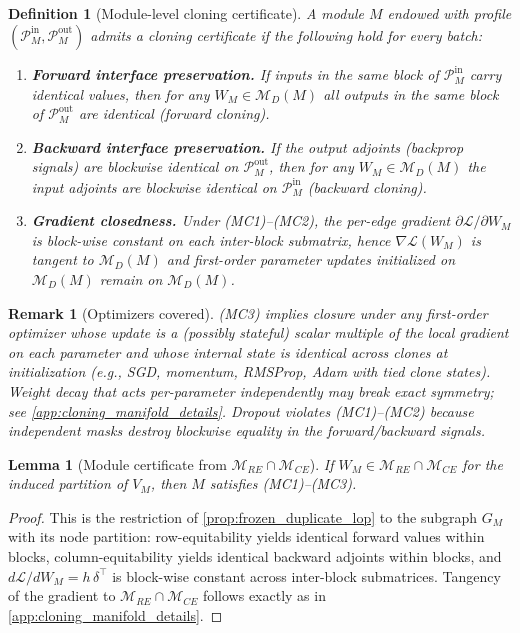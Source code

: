 \documentclass{article}
\newcommand{\Loss}{\mathcal{L}}
\newcommand{\ManifoldD}{\mathcal{M}_{D}}
\newcommand{\ManifoldRE}{\mathcal{M}_{RE}}
\newcommand{\ManifoldCE}{\mathcal{M}_{CE}}
\newtheorem{definition}{Definition}[section]
\newtheorem{lemma}{Lemma}[section]
\newtheorem{remark}{Remark}[section]
\numberwithin{figure}{section}
\begin{document}
\begin{definition}[Module-level cloning certificate]
\label{def:module_certificate}
A module $M$ endowed with profile $(\mathcal{P}^\mathrm{in}_M,\mathcal{P}^\mathrm{out}_M)$ admits a \emph{cloning certificate} if the following hold for every batch:
\begin{enumerate}[label=(MC\arabic*), leftmargin=2.1em]
\item \textbf{Forward interface preservation.} If inputs in the same block of $\mathcal{P}^\mathrm{in}_M$ carry identical values, then for any $W_M\in\ManifoldD(M)$ all outputs in the same block of $\mathcal{P}^\mathrm{out}_M$ are identical (forward cloning).
\item \textbf{Backward interface preservation.} If the output adjoints (backprop signals) are blockwise identical on $\mathcal{P}^\mathrm{out}_M$, then for any $W_M\in\ManifoldD(M)$ the input adjoints are blockwise identical on $\mathcal{P}^\mathrm{in}_M$ (backward cloning).
\item \textbf{Gradient closedness.} Under (MC1)–(MC2), the per-edge gradient $\partial\Loss/\partial W_M$ is block-wise constant on each inter-block submatrix, hence $\nabla\Loss(W_M)$ is tangent to $\ManifoldD(M)$ and first-order parameter updates initialized on $\ManifoldD(M)$ remain on $\ManifoldD(M)$.
\end{enumerate}
\end{definition}

\begin{remark}[Optimizers covered]
\label{rem:optimizers_modular}
(MC3) implies closure under any first-order optimizer whose update is a (possibly stateful) scalar multiple of the local gradient on each parameter and whose internal state is identical across clones at initialization (e.g., SGD, momentum, RMSProp, Adam with tied clone states). Weight decay that acts per-parameter independently may break exact symmetry; see \cref{app:cloning_manifold_details}. Dropout violates (MC1)–(MC2) because independent masks destroy blockwise equality in the forward/backward signals.
\end{remark}

\begin{lemma}[Module certificate from \texorpdfstring{$\ManifoldRE\cap\ManifoldCE$}{RE∩CE}]
\label{lem:module_from_RE_CE}
If $W_M\in \ManifoldRE\cap\ManifoldCE$ for the induced partition of $V_M$, then $M$ satisfies (MC1)–(MC3).
\end{lemma}

\begin{proof}
This is the restriction of \cref{prop:frozen_duplicate_lop} to the subgraph $G_M$ with its node partition: row-equitability yields identical forward values within blocks, column-equitability yields identical backward adjoints within blocks, and $d\Loss/dW_M=h\,\delta^\top$ is block-wise constant across inter-block submatrices. Tangency of the gradient to $\ManifoldRE\cap\ManifoldCE$ follows exactly as in \cref{app:cloning_manifold_details}.
\end{proof}
\end{document}
